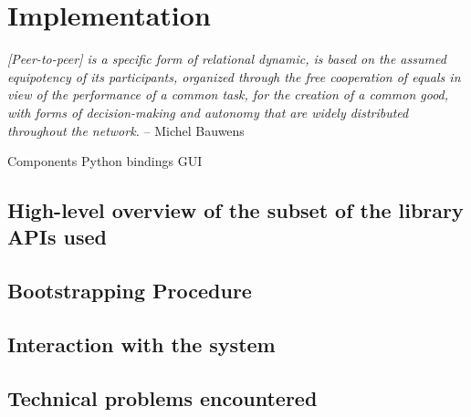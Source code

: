 \chapter{Implementation}



\textit{[Peer-to-peer] is a specific form of relational dynamic, is based on the assumed equipotency of its participants, organized through the free cooperation of equals in view of the performance of a common task, for the creation of a common good, with forms of decision-making and autonomy that are widely distributed throughout the network.} -- Michel Bauwens~\cite{p2pfoundation:definition}

Components
	Python bindings
	GUI
	

\section{High-level overview of the subset of the library APIs used}

\section{Bootstrapping Procedure}

\section{Interaction with the system}

\section{Technical problems encountered}